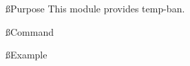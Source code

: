
\ss{Purpose}
This module provides temp-ban.

\ss{Command}

\ss{Example}
\begin{example}{}
\end{example}
